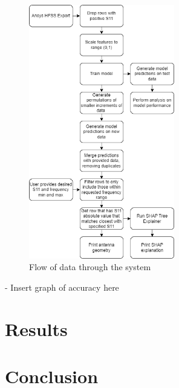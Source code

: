 \documentclass[lettersize,journal]{IEEEtran}
\begin{document}
\begin{figure}[!t]
\centering
\includegraphics[width=2.5in]{methodology}
\caption{Flow of data through the system}
\label{fig_sim}
\end{figure}
    
- Insert graph of accuracy here 


\section{Results}


\section{Conclusion}







\vfill
\end{document}
